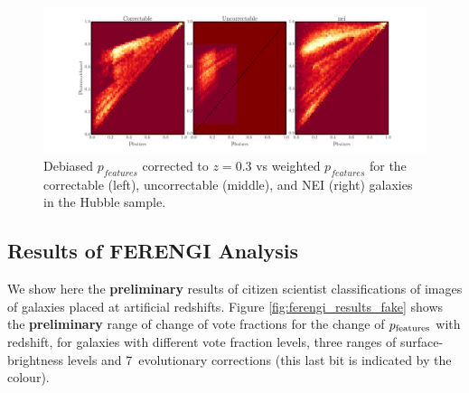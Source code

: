 \documentclass[usenatbib]{mn2e}
\begin{document}
\begin{figure}
\begin{center}
\includegraphics[width=\textwidth]{figures/debiased_corrections.pdf}
\caption{Debiased $p_{features}$ corrected to $z=0.3$ vs weighted $p_{features}$ for the correctable (left), uncorrectable (middle), and NEI (right) galaxies in the Hubble sample.}

\label{fig:features_corrections}
\end{center}
\end{figure}

\subsection{Results of FERENGI Analysis}

We show here the {\bf preliminary} results of citizen scientist classifications of images of galaxies placed at artificial redshifts. Figure \ref{fig:ferengi_results_fake} shows the {\bf preliminary} range of change of vote fractions for the change of $p_{\rm features}$ with redshift, for galaxies with different vote fraction levels, three ranges of surface-brightness levels and 7~evolutionary corrections (this last bit is indicated by the colour). 
\end{document}
